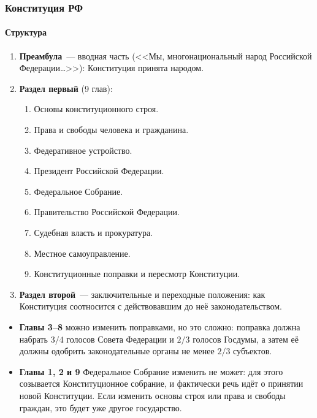 \documentclass[12pt]{article}
\begin{document}
	\subsubsection{Конституция РФ}
	
	\paragraph{Структура}
	
	\begin{enumerate}
		\item \textbf{Преамбула}~--- вводная часть (<<Мы, многонациональный народ Российской Федерации\ldots>>): Конституция принята народом.
		\item \textbf{Раздел первый} (9 глав):
		\begin{enumerate}
			\item Основы конституционного строя.
			\item Права и свободы человека и гражданина.
			\item Федеративное устройство.
			\item Президент Российской Федерации.
			\item Федеральное Собрание.
			\item Правительство Российской Федерации.
			\item Судебная власть и прокуратура.
			\item Местное самоуправление.
			\item Конституционные поправки и пересмотр Конституции.
		\end{enumerate}
		\item \textbf{Раздел второй}~--- заключительные и переходные положения: как Конституция соотносится с действовавшим до неё законодательством.
	\end{enumerate}
	
	\begin{note}
		\begin{itemize}
			\item \textbf{Главы 3--8} можно изменить поправками, но это сложно: поправка должна набрать $3/4$ голосов Совета Федерации и $2/3$ голосов Госдумы, а затем её должны одобрить законодательные органы не менее $2/3$ субъектов.
			\item \textbf{Главы 1, 2 и 9} Федеральное Собрание изменить не может: для этого созывается Конституционное собрание, и фактически речь идёт о принятии новой Конституции. Если изменить основы строя или права и свободы граждан, это будет уже другое государство.
		\end{itemize}
	\end{note}
	
\end{document}

